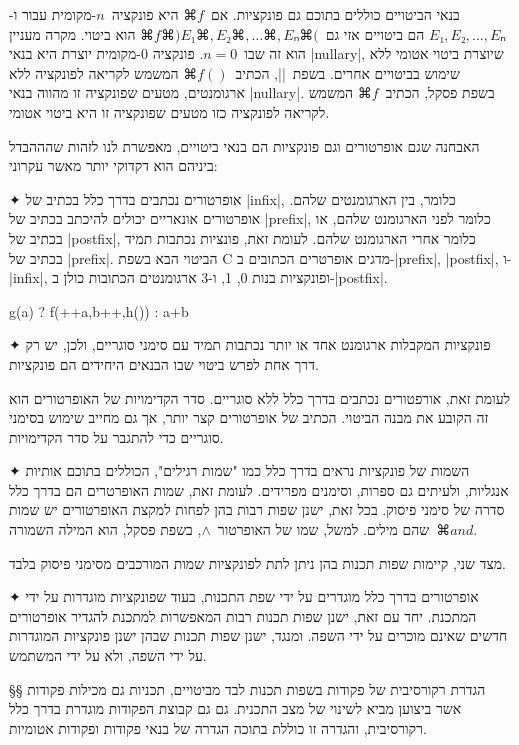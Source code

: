 בנאי הביטויים כוללים בתוכם גם פונקציות. אם~$⌘f$ היא פונקציה~$n$-מקומית עבור
ו-$E₁,E₂,…,Eₙ$ הם ביטויים אזי גם~$⌘f⌘)E₁⌘,E₂⌘,…⌘,Eₙ⌘($ הוא ביטוי.  מקרה מעניין
הוא זה שבו~$n=0$. פונקציה 0-מקומית יוצרת היא בנאי \E|nullary|, שיוצרת ביטוי
אטומי ללא שימוש בביטויים אחרים.  בשפת~\E|\CPL|, הכתיב~$⌘{f()}$ המשמש לקריאה
לפונקציה ללא ארגומנטים, מטעים שפונקציה זו מהווה בנאי \E|nullary|.  בשפת פסקל,
הכתיב~$⌘f$ המשמש לקריאה לפונקציה כזו מטעים שפונקציה זו היא ביטוי אטומי.

האבחנה שגם אופרטורים וגם פונקציות הם בנאי ביטויים, מאפשרת לנו לזהות שהההבדל
ביניהם הוא דקדוקי יותר מאשר עקרוני:

✦ אופרטורים נכתבים בדרך כלל בכתיב של \E|infix|, כלומר, בין הארגומנטים שלהם.
אופרטורים אונאריים יכולים להיכתב בכתיב של \E|prefix|, כלומר לפני הארגומנט שלהם,
או בכתיב של \E|postfix|, כלומר אחרי הארגומנט שלהם. לעומת זאת, פונציות נכתבות
תמיד בכתיב של \E|prefix|.
הביטוי הבא בשפת C מדגים אופרטרים הכתובים ב-\E|prefix|, \E|postfix|, ו-\E|infix|,
ופונקציות בנות 0, 1, ו-3 ארגומנטים הכתובות כולן ב-\E|postfix|.
\begin{CPP}
     g(a) ? f(++a,b++,h()) : a+b
\end{CPP}
✦ פונקציות המקבלות ארגומנט אחד או יותר נכתבות תמיד עם סימני סוגריים, ולכן, יש
רק דרך אחת לפרש ביטוי שבו הבנאים היחידים הם פונקציות.

לעומת זאת, אורפטורים נכתבים בדרך כלל ללא סוגריים. סדר הקדימויות של האופרטורים
הוא זה הקובע את מבנה הביטוי. הכתיב של אופרטורים קצר יותר, אך גם מחייב
שימוש בסימני סוגריים כדי להתגבר על סדר הקדימויות.

✦ השמות של פונקציות נראים בדרך כלל כמו "שמות רגילים", הכוללים בתוכם אותיות
אנגליות, ולעיתים גם ספרות, וסימנים מפרידים. לעומת זאת, שמות האופרטרים הם בדרך
כלל סדרה של סימני פיסוק. בכל זאת, ישנן שפות רבות בהן לפחות למקצת האופרטורים יש
שמות שהם מילים. למשל, שמו של האופרטור~$∧$, בשפת פסקל, הוא המילה
השמורה~$⌘{and}$.

מצד שני, קיימות שפות תכנות בהן ניתן לתת לפונקציות שמות המורכבים מסימני פיסוק
בלבד.

✦ אופרטורים בדרך כלל מוגדרים על ידי שפת התכנות, בעוד שפונקציות מוגדרות על ידי
  המתכנת. יחד עם זאת, ישנן שפות תכנות רבות המאפשרות למתכנת להגדיר אופרטורים
  חדשים שאינם מוכרים על ידי השפה. ומנגד, ישנן שפות תכנות שבהן ישנן פונקציות
  המוגדרות על ידי השפה, ולא על ידי המשתמש.

§§ הגדרת רקורסיבית של פקודות בשפות תכנות
לבד מביטויים, תכניות גם מכילות פקודות אשר ביצוען מביא לשינוי של מצב התכנית. גם
גם קבוצת הפקודות מוגדרת בדרך כלל רקורסיבית, והגדרה זו כוללת בתוכה
הגדרה של בנאי פקודות ופקודות אטומיות.

